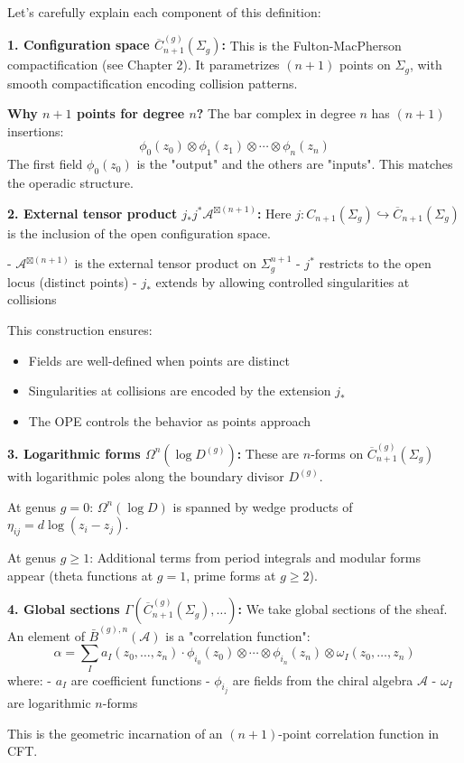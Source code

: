 \begin{remark}\label{rem:unpacking-bar-def}
Let's carefully explain each component of this definition:

\textbf{1. Configuration space $\overline{C}_{n+1}^{(g)}(\Sigma_g)$:}
This is the Fulton-MacPherson compactification (see Chapter 2). It parametrizes $(n+1)$ points on $\Sigma_g$, with smooth compactification encoding collision patterns.

\textbf{Why $n+1$ points for degree $n$?} The bar complex in degree $n$ has $(n+1)$ insertions:
$$\phi_0(z_0) \otimes \phi_1(z_1) \otimes \cdots \otimes \phi_n(z_n)$$
The first field $\phi_0(z_0)$ is the "output" and the others are "inputs". This matches the operadic structure.

\textbf{2. External tensor product $j_*j^*\mathcal{A}^{\boxtimes(n+1)}$:}
Here $j: C_{n+1}(\Sigma_g) \hookrightarrow \overline{C}_{n+1}(\Sigma_g)$ is the inclusion of the open configuration space.

- $\mathcal{A}^{\boxtimes(n+1)}$ is the external tensor product on $\Sigma_g^{n+1}$
- $j^*$ restricts to the open locus (distinct points)
- $j_*$ extends by allowing controlled singularities at collisions

This construction ensures:
\begin{itemize}
\item Fields are well-defined when points are distinct
\item Singularities at collisions are encoded by the extension $j_*$
\item The OPE controls the behavior as points approach
\end{itemize}

\textbf{3. Logarithmic forms $\Omega^n(\log D^{(g)})$:}
These are $n$-forms on $\overline{C}_{n+1}^{(g)}(\Sigma_g)$ with logarithmic poles along the boundary divisor $D^{(g)}$.

At genus $g=0$: $\Omega^n(\log D)$ is spanned by wedge products of $\eta_{ij} = d\log(z_i - z_j)$.

At genus $g \geq 1$: Additional terms from period integrals and modular forms appear (theta functions at $g=1$, prime forms at $g \geq 2$).

\textbf{4. Global sections $\Gamma(\overline{C}_{n+1}^{(g)}(\Sigma_g), \ldots)$:}
We take global sections of the sheaf. An element of $\bar{B}^{(g),n}(\mathcal{A})$ is a "correlation function":
$$\alpha = \sum_I a_I(z_0, \ldots, z_n) \cdot \phi_{i_0}(z_0) \otimes \cdots \otimes \phi_{i_n}(z_n) \otimes \omega_I(z_0, \ldots, z_n)$$
where:
- $a_I$ are coefficient functions
- $\phi_{i_j}$ are fields from the chiral algebra $\mathcal{A}$
- $\omega_I$ are logarithmic $n$-forms

This is the geometric incarnation of an $(n+1)$-point correlation function in CFT.
\end{remark}

